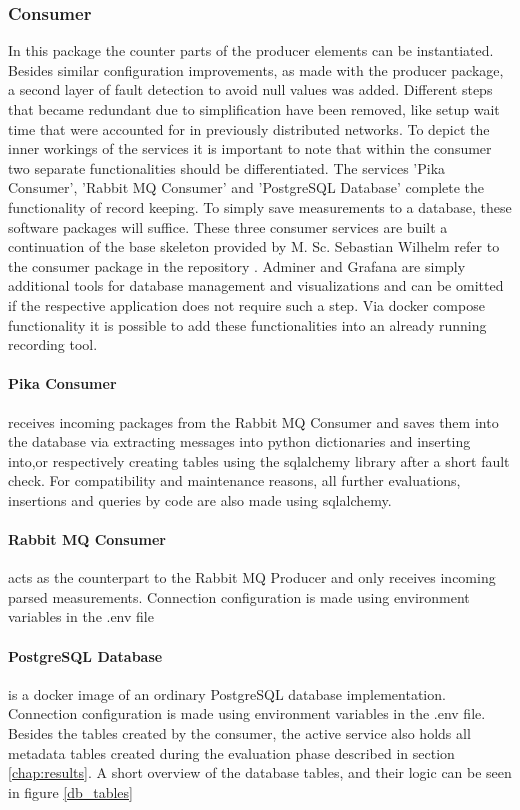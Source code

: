 \subsubsection{Consumer}
 In this package the counter parts of the producer elements can be instantiated. Besides similar configuration improvements, as made with the producer package, a second layer of fault detection to avoid null values was added. Different steps that became redundant due to simplification have been removed, like setup wait time that were accounted for in previously distributed networks. To depict the inner workings of the services it is important to note that within the consumer two separate functionalities should be differentiated. The services 'Pika Consumer', 'Rabbit MQ Consumer' and 'PostgreSQL Database' complete the functionality of record keeping. To simply save measurements to a database, these software packages will suffice. These three consumer services are built a continuation of the base skeleton provided by M. Sc. Sebastian Wilhelm refer to the consumer package in the repository \cite{wilhelm_repo}. Adminer and Grafana are simply additional tools for database management and visualizations and can be omitted if the respective application does not require such a step. Via docker compose functionality it is possible to add these functionalities into an already running recording tool.

\paragraph{Pika Consumer} receives incoming packages from the Rabbit MQ Consumer and saves them into the database via extracting messages into python dictionaries and inserting into,or respectively creating tables using the sqlalchemy library after a short fault check. For compatibility and maintenance reasons, all further evaluations, insertions and queries by code are also made using sqlalchemy. 

\paragraph{Rabbit MQ Consumer} acts as the counterpart to the Rabbit MQ Producer and only receives incoming parsed measurements. Connection configuration is made using environment variables in the .env file
	
\paragraph{PostgreSQL Database} is a docker image of an ordinary PostgreSQL database implementation. Connection configuration is made using environment variables in the .env file. Besides the tables created by the consumer, the active service also holds all metadata tables created during the evaluation phase described in section \ref{chap:results}. A short overview of the database tables, and their logic can be seen in figure \ref{db_tables}

